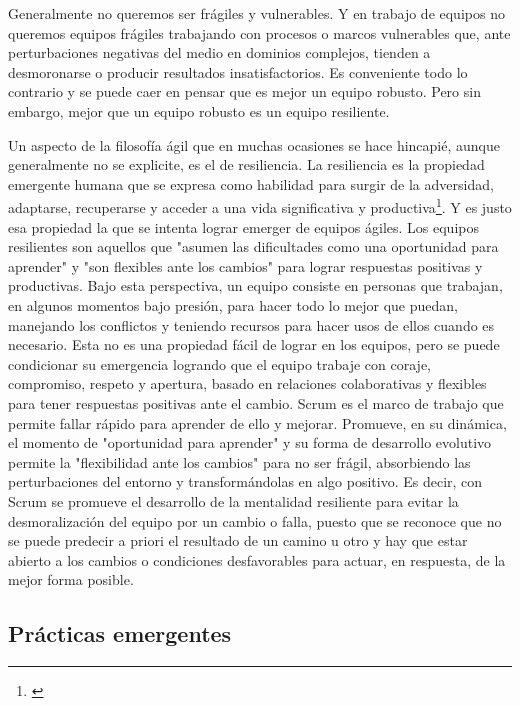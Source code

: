 Generalmente no queremos ser frágiles y vulnerables. Y en trabajo de equipos no queremos equipos frágiles trabajando con procesos o marcos vulnerables que, ante perturbaciones negativas del medio en dominios complejos, tienden a desmoronarse o producir resultados insatisfactorios. Es conveniente todo lo contrario y se puede caer en pensar que es mejor un equipo robusto. Pero sin embargo, mejor que un equipo robusto es un equipo resiliente. 

Un aspecto de la filosofía ágil que en muchas ocasiones se hace hincapié, aunque generalmente no se explicite, es el de resiliencia. La resiliencia es la propiedad emergente humana que se expresa como habilidad para surgir de la adversidad, adaptarse, recuperarse y acceder a una vida significativa y productiva\footnote{\cite{OPS-OMS-1998}}. Y es justo esa propiedad la que se intenta lograr emerger de equipos ágiles. Los equipos resilientes son aquellos que "asumen las dificultades como una oportunidad para aprender" y "son flexibles ante los cambios" para lograr respuestas positivas y productivas. Bajo esta perspectiva, un equipo consiste en personas que trabajan, en algunos momentos bajo presión, para hacer todo lo mejor que puedan, manejando los conflictos y teniendo recursos para hacer usos de ellos cuando es necesario. Esta no es una propiedad fácil de lograr en los equipos, pero se puede condicionar su emergencia logrando que el equipo trabaje con coraje, compromiso, respeto y apertura, basado en relaciones colaborativas y flexibles para tener respuestas positivas ante el cambio. Scrum es el marco de trabajo que permite fallar rápido para aprender de ello y mejorar. Promueve, en su dinámica, el momento de "oportunidad para aprender" y su forma de desarrollo evolutivo permite la "flexibilidad ante los cambios" para no ser frágil, absorbiendo las perturbaciones del entorno y transformándolas en algo positivo. Es decir, con Scrum se promueve el desarrollo de la mentalidad resiliente para evitar la desmoralización del equipo por un cambio o falla, puesto que se reconoce que no se puede predecir a priori el resultado de un camino u otro y hay que estar abierto a los cambios o condiciones desfavorables para actuar, en respuesta, de la mejor forma posible.

\subsection{Prácticas emergentes}

